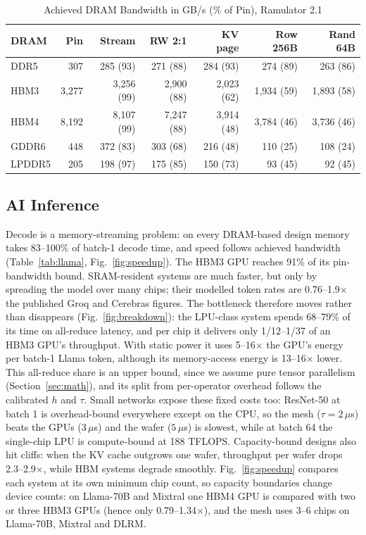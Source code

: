 \documentclass[conference]{IEEEtran}
\newcommand{\tmx}{\ensuremath{\times}}
\begin{document}
\begin{table}[t]
\caption{Achieved DRAM Bandwidth in GB/s (\% of Pin), Ramulator 2.1}
\label{tab:calib}
\centering
\footnotesize
\setlength{\tabcolsep}{2.2pt}
\begin{tabular}{@{}lrrrrrr@{}}
\toprule
DRAM & Pin & Stream & RW 2:1 & KV page & Row 256B & Rand 64B\\
\midrule
DDR5 & 307 & 285 (93) & 271 (88) & 284 (93) & 274 (89) & 263 (86)\\
HBM3 & 3,277 & 3,256 (99) & 2,900 (88) & 2,023 (62) & 1,934 (59) & 1,893 (58)\\
HBM4 & 8,192 & 8,107 (99) & 7,247 (88) & 3,914 (48) & 3,784 (46) & 3,736 (46)\\
GDDR6 & 448 & 372 (83) & 303 (68) & 216 (48) & 110 (25) & 108 (24)\\
LPDDR5 & 205 & 198 (97) & 175 (85) & 150 (73) & 93 (45) & 92 (45)\\
\bottomrule
\end{tabular}
\end{table}

\subsection{AI Inference}
Decode is a memory-streaming problem: on every DRAM-based design memory takes 83--100\% of batch-1 decode time, and speed follows achieved bandwidth (Table~\ref{tab:llama}, Fig.~\ref{fig:speedup}). The HBM3 GPU reaches 91\% of its pin-bandwidth bound. SRAM-resident systems are much faster, but only by spreading the model over many chips; their modelled token rates are 0.76--1.9\tmx{} the published Groq and Cerebras figures. The bottleneck therefore moves rather than disappears (Fig.~\ref{fig:breakdown}): the LPU-class system spends 68--79\% of its time on all-reduce latency, and per chip it delivers only 1/12--1/37 of an HBM3 GPU's throughput. With static power it uses 5--16\tmx{} the GPU's energy per batch-1 Llama token, although its memory-access energy is 13--16\tmx{} lower. This all-reduce share is an upper bound, since we assume pure tensor parallelism (Section~\ref{sec:math}), and its split from per-operator overhead follows the calibrated $h$ and $\tau$. Small networks expose these fixed costs too: ResNet-50 at batch 1 is overhead-bound everywhere except on the CPU, so the mesh ($\tau=2\,\mu$s) beats the GPUs ($3\,\mu$s) and the wafer ($5\,\mu$s) is slowest, while at batch 64 the single-chip LPU is compute-bound at 188 TFLOPS. Capacity-bound designs also hit cliffs: when the KV cache outgrows one wafer, throughput per wafer drops 2.3--2.9\tmx{}, while HBM systems degrade smoothly. Fig.~\ref{fig:speedup} compares each system at its own minimum chip count, so capacity boundaries change device counts: on Llama-70B and Mixtral one HBM4 GPU is compared with two or three HBM3 GPUs (hence only 0.79--1.34\tmx), and the mesh uses 3--6 chips on Llama-70B, Mixtral and DLRM.
\end{document}
